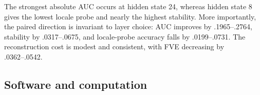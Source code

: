 \begin{table}[h]
\centering
\caption{Gemma layer sensitivity. Each entry is exact blockwise control / ours from a paired run. The proposed relations improve intent AUC and cross-locale stability and reduce locale-probe accuracy at all four layers.}
\label{tab:layer-sensitivity}
\end{table}

The strongest absolute AUC occurs at hidden state 24, whereas hidden state 8 gives the lowest locale probe and nearly the highest stability. More importantly, the paired direction is invariant to layer choice: AUC improves by .1965--.2764, stability by .0317--.0675, and locale-probe accuracy falls by .0199--.0731. The reconstruction cost is modest and consistent, with FVE decreasing by .0362--.0542.

\subsection{Software and computation}

